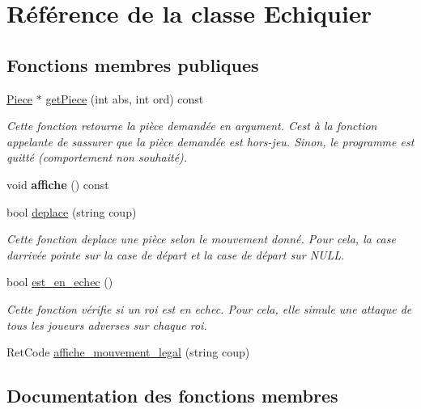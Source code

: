 \hypertarget{classEchiquier}{}\section{Référence de la classe Echiquier}
\label{classEchiquier}
\subsection*{Fonctions membres publiques}
\begin{DoxyCompactItemize}
\item 
\hyperlink{classPiece}{Piece} $\ast$ \hyperlink{classEchiquier_a1d265e55a73ab57f3a208bac01c59ebd}{get\+Piece} (int abs, int ord) const
\begin{DoxyCompactList}\small\item\em Cette fonction retourne la pièce demandée en argument. C\textquotesingle{}est à la fonction appelante de s\textquotesingle{}assurer que la pièce demandée est hors-\/jeu. Sinon, le programme est quitté (comportement non souhaité). \end{DoxyCompactList}\item 
\mbox{\label{classEchiquier_af22265120d527dfb2fa91187c4ce01cf}} 
void {\bfseries affiche} () const
\item 
bool \hyperlink{classEchiquier_a2ea383ab5acef9fb01881f8fd6b84055}{deplace} (string coup)
\begin{DoxyCompactList}\small\item\em Cette fonction deplace une pièce selon le mouvement donné. Pour cela, la case d\textquotesingle{}arrivée pointe sur la case de départ et la case de départ sur N\+U\+LL. \end{DoxyCompactList}\item 
bool \hyperlink{classEchiquier_ad453eba7d2462c3ded58ce755d38e673}{est\+\_\+en\+\_\+echec} ()
\begin{DoxyCompactList}\small\item\em Cette fonction vérifie si un roi est en echec. Pour cela, elle simule une attaque de tous les joueurs adverses sur chaque roi. \end{DoxyCompactList}\item 
Ret\+Code \hyperlink{classEchiquier_a0e63670c6b3fc2ff52dc5a007b20611f}{affiche\+\_\+mouvement\+\_\+legal} (string coup)
\end{DoxyCompactItemize}


\subsection{Documentation des fonctions membres}
\mbox{\label{classEchiquier_a0e63670c6b3fc2ff52dc5a007b20611f}} 
